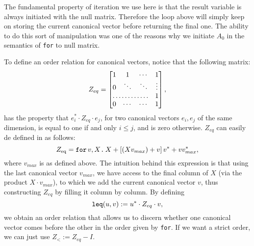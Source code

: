 The fundamental property of iteration we use here is that the result variable is always initiated with the null matrix. Therefore the loop above will simply keep on storing the current canonical vector before returning the final one. The ability to do this sort of manipulation was one of the reasons why we initiate $A_0$ in the semantics of \texttt{for} to null matrix.

To define an order relation for canonical vectors, notice that the following matrix:
\[
Z_{eq} = \begin{bmatrix}
    1 & 1 & \cdots &  1 \\
    0 & \ddots & \ddots & \vdots \\
    \hdotsfor{3} & 1 \\
    0 & \cdots & \cdots & 1 
\end{bmatrix},
\] 
has the property that $e_i^*\cdot Z_{eq} \cdot e_j$, for two canonical vectors $e_i,e_j$ of the same dimension, is equal to one if and only $i\leq j$, and is zero otherwise. $Z_{eq}$ can easily de defined in \langfor as follows:
$$Z_{\text{eq}}=\texttt{for}\, v,X \texttt{.}\, X + \left[ (Xv_{max}) + v \right]v^* + vv^*_{max},$$
where $v_{max}$ is as defined above. The intuition behind this expression is that using the last canonical vector $v_{max}$, we have access to the final column of $X$ (via the product $X\cdot v_{max}$), to which we add the current canonical vector $v$, thus constructing $Z_{eq}$ by filling it column by column. By defining $$\texttt{leq}(u,v) := u^*\cdot Z_{eq} \cdot v,$$
we obtain an order relation that allows us to discern whether one canonical vector comes before the other in the order given by \texttt{for}. If we want a strict order, we can just use $Z_< := Z_{eq} - I$.

